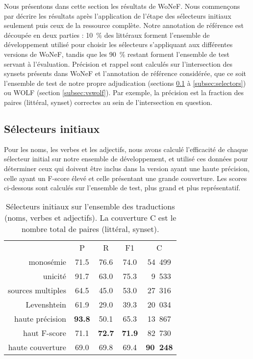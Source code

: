 Nous présentons dans cette section les résultats de WoNeF. Nous commençons par
décrire les résultats après l'application de l'étape des sélecteurs initiaux
seulement puis ceux de la ressource complète. Notre annotation de référence est
découpée en deux parties : 10~\% des littéraux forment l'ensemble de
développement utilisé pour choisir les sélecteurs s'appliquant aux différentes
versions de WoNeF, tandis que les 90~\% restant forment l'ensemble de test
servant à l'évaluation. Précision et rappel sont calculés sur l'intersection
des synsets présents dans WoNeF et l'annotation de référence considérée, que ce
soit l'ensemble de test de notre propre adjudication (sections
\ref{subsec:heuristics} à \ref{subsec:selectors}) ou WOLF (section
\ref{subsec:vswolf}). Par exemple, la précision est la fraction des paires
(littéral, synset) correctes au sein de l'intersection en question.

\subsection{Sélecteurs initiaux}
\label{subsec:heuristics}

Pour les noms, les verbes et les adjectifs, nous avons calculé l'efficacité de
chaque sélecteur initial sur notre ensemble de développement, et utilisé ces
données pour déterminer ceux qui doivent être inclus dans la version ayant une
haute précision, celle ayant un F-score élevé et celle présentant une grande
couverture. Les scores ci-dessous sont calculés sur l'ensemble de test, plus
grand et plus représentatif.

\let\b\textbf

\begin{table}[ht]
\centering
\begin{tabular}{rcccc}
  \toprule
                    & P & R & F1 & C \\
  monosémie         & 71.5 & 76.6 & 74.0 & 54~499 \\
  unicité           & 91.7 & 63.0 & 75.3 & ~9~533 \\
  sources multiples & 64.5 & 45.0 & 53.0 & 27~316 \\
  Levenshtein       & 61.9 & 29.0 & 39.3 & 20~034 \\
  \midrule
  haute précision   & \b{93.8} & 50.1     & 65.3     & 13~867 \\
  haut F-score      & 71.1     & \b{72.7} & \b{71.9} & 82~730 \\
  haute couverture  & 69.0     & 69.8     & 69.4     & \b{90~248} \\
  \bottomrule
\end{tabular}
\caption{\protect\centering\label{table:heuristics}Sélecteurs initiaux sur l'ensemble des traductions (noms, verbes et adjectifs). La couverture C est le nombre total de paires (littéral, synset).}
\end{table}

